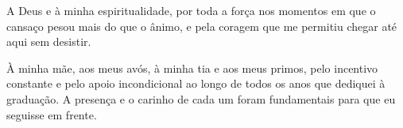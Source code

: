 
\begin{agradecimentos}

A Deus e à minha espiritualidade, por toda a força nos momentos em que
o cansaço pesou mais do que o ânimo, e pela coragem que me permitiu
chegar até aqui sem desistir.

À minha mãe, aos meus avós, à minha tia e aos meus primos, pelo
incentivo constante e pelo apoio incondicional ao longo de todos os anos
que dediquei à graduação. A presença e o carinho de cada um foram
fundamentais para que eu seguisse em frente.

\end{agradecimentos}